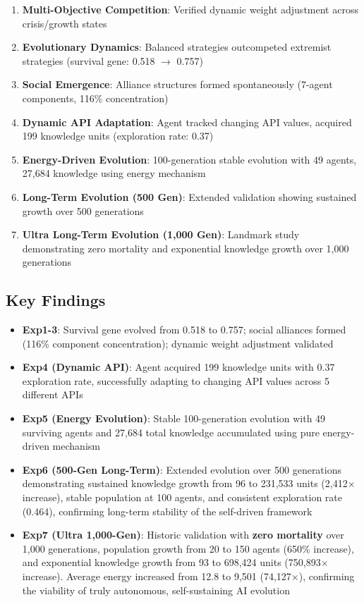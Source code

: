 \documentclass[10pt,a4paper]{article}
\begin{document}
\begin{enumerate}
    \item \textbf{Multi-Objective Competition}: Verified dynamic weight adjustment across crisis/growth states
    \item \textbf{Evolutionary Dynamics}: Balanced strategies outcompeted extremist strategies (survival gene: 0.518 $\rightarrow$ 0.757)
    \item \textbf{Social Emergence}: Alliance structures formed spontaneously (7-agent components, 116\% concentration)
    \item \textbf{Dynamic API Adaptation}: Agent tracked changing API values, acquired 199 knowledge units (exploration rate: 0.37)
    \item \textbf{Energy-Driven Evolution}: 100-generation stable evolution with 49 agents, 27,684 knowledge using energy mechanism
    \item \textbf{Long-Term Evolution (500 Gen)}: Extended validation showing sustained growth over 500 generations
    \item \textbf{Ultra Long-Term Evolution (1,000 Gen)}: Landmark study demonstrating zero mortality and exponential knowledge growth over 1,000 generations
\end{enumerate}

\subsection{Key Findings}

\begin{itemize}
    \item \textbf{Exp1-3}: Survival gene evolved from 0.518 to 0.757; social alliances formed (116\% component concentration); dynamic weight adjustment validated
    \item \textbf{Exp4 (Dynamic API)}: Agent acquired 199 knowledge units with 0.37 exploration rate, successfully adapting to changing API values across 5 different APIs
    \item \textbf{Exp5 (Energy Evolution)}: Stable 100-generation evolution with 49 surviving agents and 27,684 total knowledge accumulated using pure energy-driven mechanism
    \item \textbf{Exp6 (500-Gen Long-Term)}: Extended evolution over 500 generations demonstrating sustained knowledge growth from 96 to 231,533 units (2,412$\times$ increase), stable population at 100 agents, and consistent exploration rate (0.464), confirming long-term stability of the self-driven framework
    \item \textbf{Exp7 (Ultra 1,000-Gen)}: Historic validation with \textbf{zero mortality} over 1,000 generations, population growth from 20 to 150 agents (650\% increase), and exponential knowledge growth from 93 to 698,424 units (750,893$\times$ increase). Average energy increased from 12.8 to 9,501 (74,127$\times$), confirming the viability of truly autonomous, self-sustaining AI evolution
\end{itemize}
\end{document}

